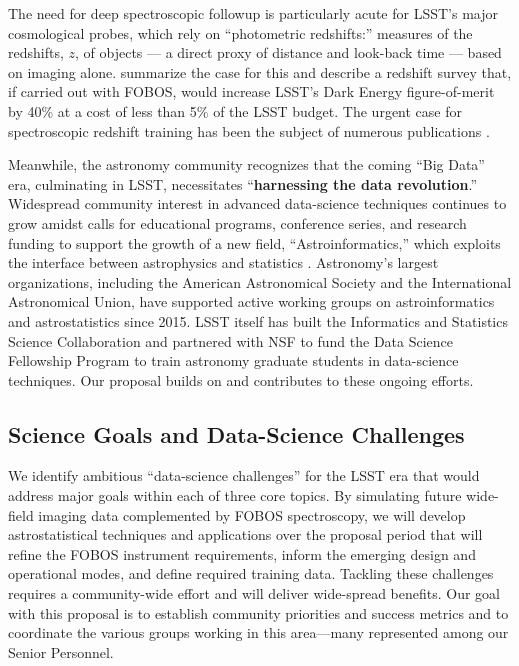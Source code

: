 \documentclass[oneside,11pt]{amsart}
\begin{document}
The need for deep spectroscopic followup is particularly acute for
LSST's major cosmological probes, which rely on ``photometric
redshifts:'' measures of the redshifts, $z$, of objects --- a direct
proxy of distance and look-back time --- based on imaging alone.
\citet{newman15} summarize the case for this and describe a redshift
survey that, if carried out with FOBOS, would increase LSST's Dark
Energy figure-of-merit by 40\% at a cost of less than 5\% of the LSST
budget.  The urgent case for spectroscopic redshift training has been
the subject of numerous publications \citep[e.g.,][]{laureijs11,
masters15, hemmati18}.

Meanwhile, the astronomy community recognizes that the coming ``Big
Data'' era, culminating in LSST, necessitates ``\textbf{harnessing the
data revolution}.''  Widespread community interest in advanced
data-science techniques continues to grow amidst calls for educational
programs, conference series, and research funding to support the growth
of a new field, ``Astroinformatics,'' which exploits the interface
between astrophysics and statistics \citep{borne09}.  Astronomy's
largest organizations, including the American Astronomical Society and
the International Astronomical Union, have supported active working
groups on astroinformatics and astrostatistics since 2015.  LSST itself
has built the Informatics and Statistics Science Collaboration and
partnered with NSF to fund the Data Science Fellowship Program to train
astronomy graduate students in data-science techniques.  Our proposal
builds on and contributes to these ongoing efforts.

\subsection{Science Goals and Data-Science Challenges}
\label{sec:goals}

We identify ambitious ``data-science challenges'' for the LSST era that
would address major goals within each of three core topics.  By
simulating future wide-field imaging data complemented by FOBOS spectroscopy,
we will develop astrostatistical techniques and applications over the
proposal period that will refine the FOBOS instrument requirements,
inform the emerging design and operational modes, and define required
training data.  Tackling these challenges requires a community-wide
effort and will deliver wide-spread benefits.  Our goal with this
proposal is to establish community priorities and success metrics and to
coordinate the various groups working in this area---many represented
among our Senior Personnel.
\end{document}
